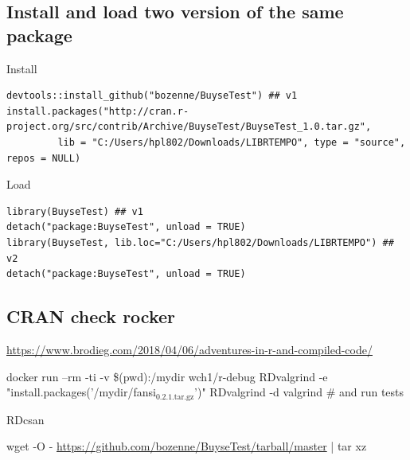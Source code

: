 \documentclass{article}
\begin{document}
\subsection{Install and load two version of the same package}
\label{sec:orgdd48ba3}

Install
\lstset{language=r,label= ,caption= ,captionpos=b,numbers=none}
\begin{lstlisting}
devtools::install_github("bozenne/BuyseTest") ## v1
install.packages("http://cran.r-project.org/src/contrib/Archive/BuyseTest/BuyseTest_1.0.tar.gz", 
		 lib = "C:/Users/hpl802/Downloads/LIBRTEMPO", type = "source", repos = NULL)
\end{lstlisting}

Load 
\lstset{language=r,label= ,caption= ,captionpos=b,numbers=none}
\begin{lstlisting}
library(BuyseTest) ## v1
detach("package:BuyseTest", unload = TRUE)
library(BuyseTest, lib.loc="C:/Users/hpl802/Downloads/LIBRTEMPO") ## v2
detach("package:BuyseTest", unload = TRUE)
\end{lstlisting}

\subsection{CRAN check rocker}
\label{sec:orga45edc8}
\url{https://www.brodieg.com/2018/04/06/adventures-in-r-and-compiled-code/}

docker run --rm -ti -v \$(pwd):/mydir wch1/r-debug
RDvalgrind -e "install.packages('/mydir/fansi\(_{\text{0.2.1.tar.gz}}\)')"
RDvalgrind -d valgrind  \# and run tests

RDcsan

wget -O - \url{https://github.com/bozenne/BuyseTest/tarball/master} | tar xz
\end{document}
